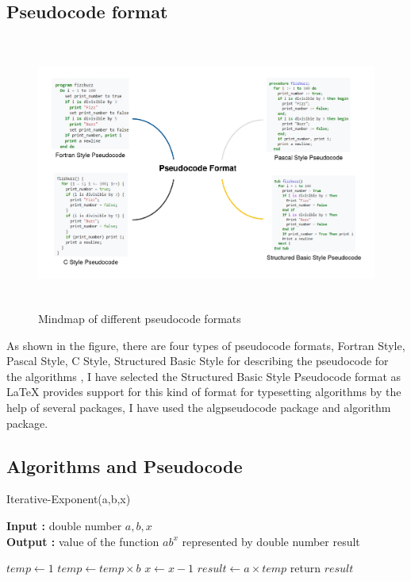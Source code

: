 \documentclass[12pt, a4paper]{article}
\begin{document}
\subsection{Pseudocode format}
\begin{figure}[h]
	\includegraphics[width=15cm,height=9cm]{Pseudocode Format.jpg}
	\caption{Mindmap of different pseudocode formats}
	\label{fig:Mindmap of different pseudocode formats}
\end{figure}
\noindent
As shown in the figure, there are four types of pseudocode formats, Fortran Style, Pascal Style, C Style, Structured Basic Style for describing the pseudocode for the algorithms \cite{Pseudocode}, I have selected the Structured Basic Style Pseudocode format as LaTeX provides support for this kind of format for typesetting algorithms by the help of several packages, I have used the algpseudocode package and algorithm package.

\newpage
\subsection{Algorithms and Pseudocode}
\begin{algorithm}[hbt!]
	\caption{Iterative-Exponent(a,b,x)}\label{alg:one}
	
	\hspace*{\algorithmicindent} \textbf{Input : }double number $a,b,x$ \\
	\hspace*{\algorithmicindent} \textbf{Output : }value of the function $ab^x$ represented by double number result
	\begin{algorithmic}[1]
		\STATE $temp \gets 1$
		\STATE $temp \gets temp \times b$
		\STATE $x \gets x - 1$
		\ENDWHILE
		\STATE $result \gets a \times temp$
		\STATE return $result$
	\end{algorithmic}
\end{algorithm}
\end{document}
